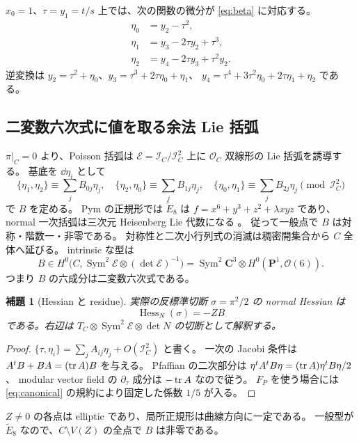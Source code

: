 \documentclass[11pt,a4paper]{ltjsarticle}
\newcommand{\CC}{\mathbf C}\newcommand{\QQ}{\mathbf Q}
\newcommand{\PP}{\mathbf P}\renewcommand{\AA}{\mathbf A}
\newcommand{\OO}{\mathcal O}\newcommand{\FF}{\mathcal F}
\DeclareMathOperator{\Sym}{Sym}\DeclareMathOperator{\lct}{lct}
\newtheorem{lemma}[theorem]{補題}
\theoremstyle{remark}\newtheorem{remark}[theorem]{注意}
\begin{document}
$x_0=1$、$\tau=y_1=t/s$ 上では、次の関数の微分が \eqref{eq:beta} に対応する。
\begin{equation}\label{eq:eta}
\begin{split}
 \eta_0&=y_2-\tau^2,\\
 \eta_1&=y_3-2\tau y_2+\tau^3,\\
 \eta_2&=y_4-2\tau y_3+\tau^2y_2.
\end{split}
\end{equation}
逆変換は
$y_2=\tau^2+\eta_0$、$y_3=\tau^3+2\tau\eta_0+\eta_1$、
$y_4=\tau^4+3\tau^2\eta_0+2\tau\eta_1+\eta_2$ である。

\subsection{二変数六次式に値を取る余法 Lie 括弧}

$\pi|_C=0$ より、Poisson 括弧は $\mathcal E=\mathcal I_C/\mathcal I_C^2$ 上に
$\OO_C$ 双線形の Lie 括弧を誘導する。
基底を $\dd\eta_i$ として
\[
 \{\eta_1,\eta_2\}\equiv\sum_jB_{0j}\eta_j,\quad
 \{\eta_2,\eta_0\}\equiv\sum_jB_{1j}\eta_j,\quad
 \{\eta_0,\eta_1\}\equiv\sum_jB_{2j}\eta_j\pmod{\mathcal I_C^2}
\]
で $B$ を定める。
Pym の正規形では $\widetilde E_8$ は
$f=x^6+y^3+z^2+\lambda xyz$ であり、normal 一次括弧は三次元 Heisenberg Lie 代数になる
\cite[Theorem 4.5, Table 1]{PymElliptic}。
従って一般点で $B$ は対称・階数一・非零である。
対称性と二次小行列式の消滅は稠密開集合から $C$ 全体へ延びる。
intrinsic な型は
\[
 B\in H^0\bigl(C,\Sym^2\mathcal E\otimes(\det\mathcal E)^{-1}\bigr)
   =\Sym^2\CC^3\otimes H^0(\PP^1,\OO(6)).
\]
つまり $B$ の六成分は二変数六次式である。

\begin{lemma}[Hessian と residue]\label{lem:hessian}
実際の反標準切断 $\sigma=\pi^2/2$ の normal Hessian は
\[
                         \operatorname{Hess}_N(\sigma)=-ZB
\]
である。右辺は $T_C\otimes\Sym^2\mathcal E\otimes\det N$ の切断として解釈する。
\end{lemma}
\begin{proof}
$\{\tau,\eta_i\}=\sum_j A_{ij}\eta_j+O(\mathcal I_C^2)$ と書く。
一次の Jacobi 条件は
$A^tB+BA=(\operatorname{tr} A)B$ を与える。
Pfaffian の二次部分は $\eta^tA^tB\eta=(\operatorname{tr} A)\eta^tB\eta/2$、
modular vector field の $\partial_\tau$ 成分は $-\operatorname{tr} A$ なので従う。
$F_P$ を使う場合には \eqref{eq:canonical} の規約により固定した係数 $1/5$ が入る。
\end{proof}

$Z\ne0$ の各点は elliptic であり、局所正規形は曲線方向に一定である。
一般型が $\widetilde E_8$ なので、$C\setminus V(Z)$ の全点で $B$ は非零である。
\end{document}
